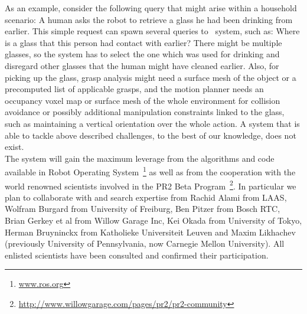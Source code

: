 As an example, consider the following query that might arise within a
household scenario: A human asks the robot to retrieve a glass he had
been drinking from earlier. This simple request can spawn several queries to
\ksem\ system, such as: Where is a glass that this person had contact with earlier?
There might be multiple glasses, so the system has to select the one
which was used for drinking and disregard other glasses that the human
might have cleaned earlier. Also, for picking up the glass, grasp
analysis might need a surface mesh of the object or a precomputed list
of applicable grasps, and the motion planner needs an occupancy voxel
map or surface mesh of the whole environment for collision avoidance or
possibly additional manipulation constraints linked to the glass, such
as maintaining a vertical orientation over the whole action.
A system that is able to tackle above described challenges, to the best of our
knowledge, does not exist.\\
The system will gain the maximum leverage from the algorithms and code available
in Robot Operating System~\footnote{\url{www.ros.org}} as well as from the cooperation
with the world renowned scientists involved in the PR2 Beta Program~\footnote{\url{http://www.willowgarage.com/pages/pr2/pr2-community}}.
In particular we plan to collaborate with and search expertise from Rachid Alami from LAAS, Wolfram Burgard
from University of Freiburg, Ben Pitzer from Bosch RTC, Brian Gerkey et al from Willow Garage Inc, 
Kei Okada from University of Tokyo, Herman  Bruyninckx from Katholieke Universiteit Leuven and Maxim Likhachev 
(previously University of Pennsylvania, now Carnegie Mellon University).
All enlisted scientists have been consulted and confirmed their participation.

